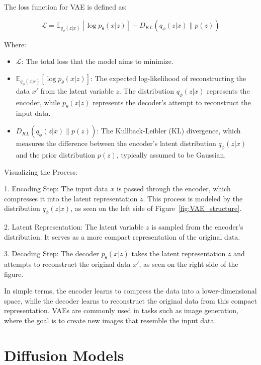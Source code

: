 The loss function for VAE is defined as:

\begin{equation}
\mathcal{L} = \mathbb{E}_{q_\phi(z|x)}[\log p_\theta(x|z)] - D_{KL}(q_\phi(z|x) \| p(z))
\end{equation}

Where:
\begin{itemize}
    \item \(\mathcal{L}\): The total loss that the model aims to minimize.
    \item \(\mathbb{E}_{q_\phi(z|x)}[\log p_\theta(x|z)]\): The expected log-likelihood of reconstructing the data \(x'\) from the latent variable \(z\). The distribution \(q_\phi(z|x)\) represents the encoder, while \(p_\theta(x|z)\) represents the decoder's attempt to reconstruct the input data.
    \item \(D_{KL}(q_\phi(z|x) \| p(z))\): The Kullback-Leibler (KL) divergence, which measures the difference between the encoder's latent distribution \(q_\phi(z|x)\) and the prior distribution \(p(z)\), typically assumed to be Gaussian.
\end{itemize}

Visualizing the Process:

1. Encoding Step: The input data \(x\) is passed through the encoder, which compresses it into the latent representation \(z\). This process is modeled by the distribution \(q_\phi(z|x)\), as seen on the left side of Figure~\ref{fig:VAE_structure}.

2. Latent Representation: The latent variable \(z\) is sampled from the encoder's distribution. It serves as a more compact representation of the original data.

3. Decoding Step: The decoder \(p_\theta(x|z)\) takes the latent representation \(z\) and attempts to reconstruct the original data \(x'\), as seen on the right side of the figure.

In simple terms, the encoder learns to compress the data into a lower-dimensional space, while the decoder learns to reconstruct the original data from this compact representation. VAEs are commonly used in tasks such as image generation, where the goal is to create new images that resemble the input data.



\section{Diffusion Models}

